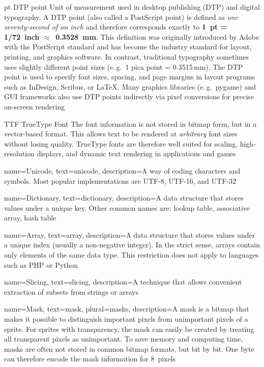 	{pt}            %
	{DTP point}     %
	{Unit of measurement used in desktop publishing (DTP) and digital typography. A DTP point (also called a PostScript point) is defined as \emph{one seventy-second of an inch} and therefore corresponds exactly to \textbf{\SI{1}{pt} = \SI{1/72}{inch} $\approx$~\SI{0.3528}{mm}}. This definition was originally introduced by Adobe with the PostScript standard and has become the industry standard for layout, printing, and graphics software. In contrast, traditional typography sometimes uses slightly different point sizes	(e.\,g.\ 1 pica point = 0.3515\,mm). The DTP point is used to specify font sizes, spacing, and page margins in layout programs such as InDesign, Scribus, or \LaTeX. Many graphics libraries (e.\,g.\ \gls{pygame}) and GUI frameworks also use DTP points indirectly via pixel conversions for precise on-screen rendering} %



	{TTF}            %
	{TrueType Font}  %
	{The font information is not stored in bitmap form, but in a vector-based format. This allows text to be rendered at \emph{arbitrary} font sizes without losing quality. TrueType fonts are therefore well suited for scaling, high-resolution	displays, and dynamic text rendering in applications and games} %


{
	name={Unicode},
	text={unicode},
	description={A way of coding characters and symbols. Most popular implementations are UTF-8, UTF-16, and UTF-32} 
}

{
	name={Dictionary},
	text={dictionary},
	description={A data structure that stores values under a unique key. Other common names are: lookup table, associative array, hash table}
}

{
	name={Array},
	text={array},
	description={A data structure that stores values under a unique index (usually a non-negative integer). In the strict sense, arrays contain only elements of the same data type. This restriction does not apply to languages such as PHP or Python}
}

{
	name={Slicing},
	text={slicing},
	description={A technique that allows convenient extraction of subsets from strings or arrays}
}

{
	name={Mask},
	text={mask},
	plural={masks},
	description={A mask is a bitmap that makes it possible to distinguish important pixels from unimportant pixels of a sprite. For sprites with transparency, the mask can easily be created by treating all transparent pixels as unimportant. To save memory and computing time, masks are often not stored in common bitmap formats, but bit by bit. One byte can therefore encode the mask information for 8~pixels} 
}

